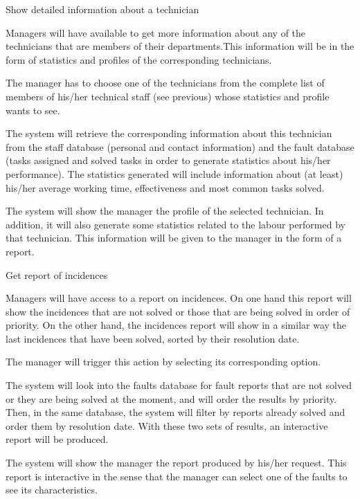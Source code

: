 \begin{requirement}{Show detailed information about a technician}

\reqdesc Managers will have available to get more information about any of the technicians that are members of their departments.This information will be in the form of statistics and profiles of the corresponding technicians.

\reqin The manager has to choose one of the technicians from the complete list of members of his/her technical staff (see previous) whose statistics and profile wants to see.

\reqsteps The system will retrieve the corresponding information about this technician from the staff database (personal and contact information) and the fault database (tasks assigned and solved tasks in order to generate statistics about his/her performance). The statistics generated will include information about (at least) his/her average working time, effectiveness and most common tasks solved.

\reqout The system will show the manager the profile of the selected technician. In addition, it will also generate some statistics related to the labour performed by that technician. This information will be given to the manager in the form of a report.

\end{requirement}


\begin{requirement}{Get report of incidences}

\reqdesc Managers will have access to a report on incidences. On one hand this report will show the incidences that are not solved or those that are being solved in order of priority. On the other hand, the incidences report will show in a similar way the last incidences that have been solved, sorted by
their resolution date.

\reqin The manager will trigger this action by selecting its corresponding option.

\reqsteps The system will look into the faults database for fault reports that are not solved or they are being solved at the moment, and will order the results by priority. Then, in the same database, the system will filter by reports already solved and order them by resolution date. With these two sets of results, an interactive report will be produced.

\reqout The system will show the manager the report produced by his/her request. This report is interactive in the sense that the manager can select one of the faults to see its characteristics.

\end{requirement}


